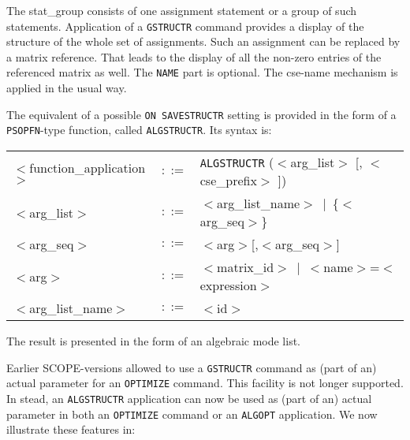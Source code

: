 The stat\_group consists
of one assignment statement or a group of such statements. Application of
a {\tt GSTRUCTR} command provides a display of the structure of the whole
set of assignments. Such an assignment can be replaced by a matrix reference.
That leads to the display of all the non-zero entries of the referenced
matrix as well. The {\tt NAME} part is optional. The cse-name mechanism
is applied in the usual way.

The equivalent of a possible {\tt ON SAVESTRUCTR} setting is provided in the
form of a {\tt PSOPFN}-type function, called {\tt ALGSTRUCTR}.
Its syntax is:

\begin{center}
\begin{tabular}{lcl}
$<$function\_application$>$ & $::=$ &
{\tt ALGSTRUCTR} ($<$arg\_list$>$ [, $<$cse\_prefix$>$ ]) \\
$<$arg\_list$>$ & $::=$ & $<$arg\_list\_name$>~\mid~$\{$<$arg\_seq$>$\}\\
$<$arg\_seq$>$ & $::=$ & $<$arg$>$[,$<$arg\_seq$>$]\\
$<$arg$>$ & $::=$ & $<$matrix\_id$>~\mid~<$name$>$=$<$expression$>$\\
$<$arg\_list\_name$>$ & $::=$ & $<$id$>$
\end{tabular}
\end{center}

The result is presented in the form of an algebraic mode list.

Earlier SCOPE-versions allowed to use a {\tt GSTRUCTR} command as (part of an)
actual parameter for an {\tt OPTIMIZE} command. This facility is not longer
supported. In stead, an {\tt ALGSTRUCTR} application can now be used as (part
of an) actual parameter in both an {\tt OPTIMIZE} command or an {\tt ALGOPT}
application. We now illustrate these features in:

\example\label{ex:4.1.2}

